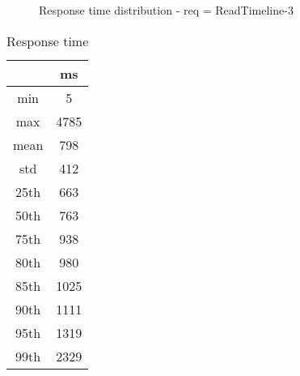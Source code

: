 \begin{minipage}{0.75\linewidth}
\begin{figure}[h]
\begin{adjustbox}{max width=1.0\linewidth, keepaspectratio}
  \end{adjustbox}
  \caption{Response time distribution - req = ReadTimeline-3}
\end{figure}
\end{minipage}\hfill\begin{minipage}{0.18\linewidth}
\begin{table}[h]
\begin{tabular}{|cc|}
\hline
\textbf{} & \textbf{ms}\\ \hline
 \Xhline{0.005\arrayrulewidth}
min & 5\\
 \Xhline{0.005\arrayrulewidth}
max & 4785\\
 \Xhline{0.005\arrayrulewidth}
mean & 798\\
 \Xhline{0.005\arrayrulewidth}
std & 412\\
\hline
\hline
 \Xhline{0.005\arrayrulewidth}
25th & 663\\
 \Xhline{0.005\arrayrulewidth}
50th & 763\\
 \Xhline{0.005\arrayrulewidth}
75th & 938\\
 \Xhline{0.005\arrayrulewidth}
80th & 980\\
 \Xhline{0.005\arrayrulewidth}
85th & 1025\\
 \Xhline{0.005\arrayrulewidth}
90th & 1111\\
 \Xhline{0.005\arrayrulewidth}
95th & 1319\\
 \Xhline{0.005\arrayrulewidth}
99th & 2329\\
\hline
\end{tabular}
\caption{Response time}
\end{table}
\end{minipage}\hfill